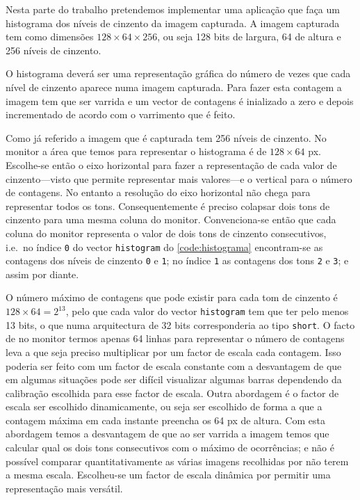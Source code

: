 \documentclass[a4paper,12pt]{article}
\begin{document}
Nesta parte do trabalho pretendemos implementar uma aplicação que faça um histograma dos níveis de cinzento da imagem capturada. A imagem capturada tem como dimensões $128\times64\times256$, ou seja 128 bits de largura, 64 de altura e 256 níveis de cinzento.

O histograma deverá ser uma representação gráfica do número de vezes que cada nível de cinzento aparece numa imagem capturada. Para fazer esta contagem a imagem tem que ser varrida e um vector de contagens é inializado a zero e depois incrementado de acordo com o varrimento que é feito.

Como já referido a imagem que é capturada tem 256 níveis de cinzento. No monitor a área que temos para representar o histograma é de $128\times64$ px. Escolhe-se então o eixo horizontal para fazer a representação de cada valor de cinzento---visto que permite representar mais valores---e o vertical para o número de contagens. No entanto a resolução do eixo horizontal não chega para representar todos os tons. Consequentemente é preciso colapsar dois tons de cinzento para uma mesma coluna do monitor. Convenciona-se então que cada coluna do monitor representa o valor de dois tons de cinzento consecutivos, i.e.\ no índice \texttt{0} do vector \texttt{histogram} do \autoref{code:histograma} encontram-se as contagens dos níveis de cinzento \texttt{0} e \texttt{1}; no índice \texttt{1} as contagens dos tons \texttt{2} e \texttt{3}; e assim por diante.

\clearpage



O número máximo de contagens que pode existir para cada tom de cinzento é $128\times64 = 2^{13}$, pelo que cada valor do vector \texttt{histogram} tem que ter pelo menos 13 bits, o que numa arquitectura de 32 bits corresponderia ao tipo \texttt{short}. O facto de no monitor termos apenas 64 linhas para representar o número de contagens leva a que seja preciso multiplicar por um factor de escala cada contagem. Isso poderia ser feito com um factor de escala constante com a desvantagem de que em algumas situações pode ser difícil visualizar algumas barras dependendo da calibração escolhida para esse factor de escala. Outra abordagem é o factor de escala ser escolhido dinamicamente, ou seja ser escolhido de forma a que a contagem máxima em cada instante preencha os 64 px de altura. Com esta abordagem temos a desvantagem de que ao ser varrida a imagem temos que calcular qual os dois tons consecutivos com o máximo de ocorrências; e não é possível comparar quantitativamente as várias imagens recolhidas por não terem a mesma escala. Escolheu-se um factor de escala dinâmica por permitir uma representação mais versátil.
\end{document}
